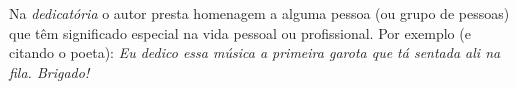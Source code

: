 Na \emph{dedicatória} o autor presta homenagem a alguma pessoa (ou grupo de pessoas)
que têm significado especial na vida pessoal ou profissional. Por exemplo (e citando o poeta):
\emph{Eu dedico essa música a primeira garota que tá sentada ali na fila. Brigado!}
